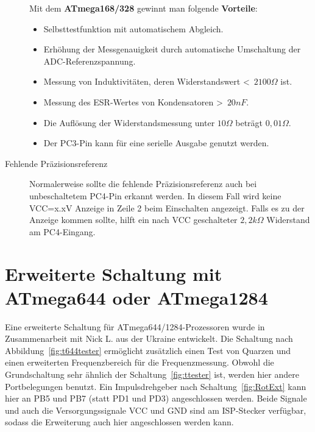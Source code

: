\begin{description}
Mit dem \textbf {ATmega168/328} gewinnt man folgende \textbf {Vorteile}:
\begin{itemize} \setlength{\itemsep}{-1.0\baselineskip}
 \vspace{-0.5\baselineskip}
 \item Selbsttestfunktion mit automatischem Abgleich.\\
 \item Erhöhung der Messgenauigkeit durch automatische Umschaltung der ADC-Referenzspannung.\\
 \item Messung von Induktivitäten, deren Widerstandswert \textless~\(2100\Omega\) ist.\\
 \item Messung des ESR-Wertes von Kondensatoren \textgreater~\(20nF\).\\
 \item Die Auflösung der Widerstandsmessung unter \(10\Omega\) beträgt \(0,01\Omega\).\\
 \item Der PC3-Pin kann für eine serielle Ausgabe genutzt werden.
\end{itemize}
\vspace{-0.5\baselineskip}
\item[Fehlende Präzisionsreferenz]
Normalerweise sollte die fehlende Präzisionsreferenz auch bei unbeschaltetem PC4-Pin
erkannt werden. In diesem Fall wird keine VCC=x.xV Anzeige in Zeile 2 beim Einschalten
angezeigt. Falls es zu der Anzeige kommen sollte, hilft ein nach VCC geschalteter 
\(2,2k\Omega\) Widerstand am PC4-Eingang.
\end{description}

\section{Erweiterte Schaltung mit ATmega644 oder ATmega1284}

Eine erweiterte Schaltung für ATmega644/1284-Prozessoren wurde in Zusammenarbeit mit Nick L. aus
der Ukraine entwickelt. Die Schaltung nach Abbildung~\ref{fig:t644tester} ermöglicht zusätzlich
einen Test von Quarzen und einen erweiterten Frequenzbereich für die Frequenzmessung.
Obwohl die Grundschaltung sehr ähnlich der Schaltung~\ref{fig:ttester} ist, werden hier
andere Portbelegungen benutzt.
Ein Impulsdrehgeber nach Schaltung~\ref{fig:RotExt} kann hier an PB5 und PB7 (statt PD1 und PD3) angeschlossen werden.
Beide Signale und auch die Versorgungssignale VCC und GND sind am ISP-Stecker verfügbar,
sodass die Erweiterung auch hier angeschlossen werden kann.

